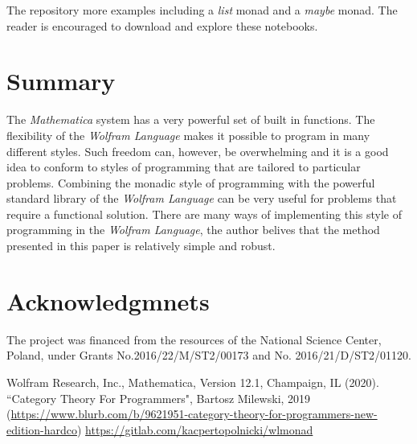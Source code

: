 \documentclass[smallextended]{svjour3}
\begin{document}
The repository \cite{repos} more examples including a
\emph{list} monad and a \emph{maybe} monad. The reader is encouraged to download
and explore these notebooks.

\section{Summary}
\label{summary}

The \emph{Mathematica} \cite{mathematica} system has a very powerful set of built in
functions. The flexibility of the \emph{Wolfram Language} makes it possible to program
in many different styles. Such freedom can, however, be overwhelming and 
it is a good idea to conform to styles of programming that are tailored
to particular problems. Combining the monadic style of programming with
the powerful standard library of the \emph{Wolfram Language} can be very
useful for problems that require a functional solution. There are many ways of
implementing this style of programming in the \emph{Wolfram Language}, the
author belives that the
method presented in this paper is relatively simple and robust.

\section*{Acknowledgmnets}

The project was financed from the resources
of the National Science Center, Poland, under Grants No.2016/22/M/ST2/00173 
and No. 2016/21/D/ST2/01120.

\begin{thebibliography}{9}

 Wolfram Research, Inc., Mathematica, Version 12.1, Champaign, IL (2020).
 ``Category Theory For Programmers", Bartosz Milewski, 2019
		(\url{https://www.blurb.com/b/9621951-category-theory-for-programmers-new-edition-hardco}) 
 \url{https://gitlab.com/kacpertopolnicki/wlmonad} 

\end{thebibliography}
\end{document}
